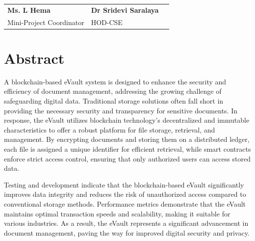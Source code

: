 \documentclass[12pt,a4paper]{report}
\begin{document}
\vspace{0.55in}
\par
\vspace{0.65in}

\begin{tabularx}{0.95 \textwidth} { 
   >{\raggedright\arraybackslash}X 
   >{\centering\arraybackslash}X 
   >{\raggedleft\arraybackslash}X  }
     \textbf{Ms. L Hema} &  \textbf{Dr Sridevi Saralaya}\\
     Mini-Project Coordinator &   HOD-CSE \\
\end{tabularx}





\pagestyle{plain}
\chapter*{Abstract}

A blockchain-based eVault system is designed to enhance the 
security and efficiency of document management, addressing 
the growing challenge of safeguarding digital data. Traditional 
storage solutions often fall short in providing the necessary 
security and transparency for sensitive documents. In response, 
the eVault utilizes blockchain technology's decentralized and 
immutable characteristics to offer a robust platform for file 
storage, retrieval, and management. By encrypting documents and 
storing them on a distributed ledger, each file is assigned a 
unique identifier for efficient retrieval, while smart contracts 
enforce strict access control, ensuring that only authorized 
users can access stored data.

Testing and development indicate that the blockchain-based eVault 
significantly improves data integrity and reduces the risk of 
unauthorized access compared to conventional storage methods. 
Performance metrics demonstrate that the eVault maintains optimal 
transaction speeds and scalability, making it suitable for various 
industries. As a result, the eVault represents a significant 
advancement in document management, paving the way for improved 
digital security and privacy.

\renewcommand{\contentsname}{Table of Contents}
\tableofcontents
{}
\listoffigures
{}
\listoftables
\newpage
\end{document}
